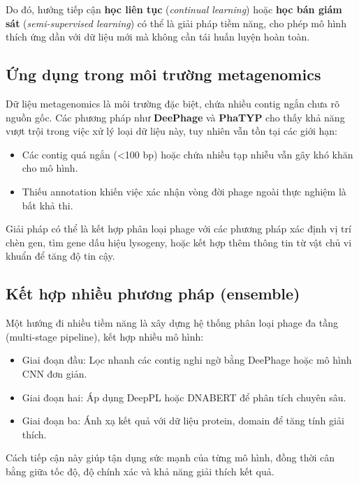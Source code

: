 Do đó, hướng tiếp cận \textbf{học liên tục} (\textit{continual learning}) hoặc \textbf{học bán giám sát} (\textit{semi-supervised learning}) có thể là giải pháp tiềm năng, cho phép mô hình thích ứng dần với dữ liệu mới mà không cần tái huấn luyện hoàn toàn.

\subsection{Ứng dụng trong môi trường metagenomics}

Dữ liệu metagenomics là môi trường đặc biệt, chứa nhiều contig ngắn chưa rõ nguồn gốc. Các phương pháp như \textbf{DeePhage} và \textbf{PhaTYP} cho thấy khả năng vượt trội trong việc xử lý loại dữ liệu này, tuy nhiên vẫn tồn tại các giới hạn:

\begin{itemize}
    \item Các contig quá ngắn (<100 bp) hoặc chứa nhiều tạp nhiễu vẫn gây khó khăn cho mô hình.
    \item Thiếu annotation khiến việc xác nhận vòng đời phage ngoài thực nghiệm là bất khả thi.
\end{itemize}

Giải pháp có thể là kết hợp phân loại phage với các phương pháp xác định vị trí chèn gen, tìm gene dấu hiệu lysogeny, hoặc kết hợp thêm thông tin từ vật chủ vi khuẩn để tăng độ tin cậy.

\subsection{Kết hợp nhiều phương pháp (ensemble)}

Một hướng đi nhiều tiềm năng là xây dựng hệ thống phân loại phage đa tầng (multi-stage pipeline), kết hợp nhiều mô hình:

\begin{itemize}
    \item Giai đoạn đầu: Lọc nhanh các contig nghi ngờ bằng DeePhage hoặc mô hình CNN đơn giản.
    \item Giai đoạn hai: Áp dụng DeepPL hoặc DNABERT để phân tích chuyên sâu.
    \item Giai đoạn ba: Ánh xạ kết quả với dữ liệu protein, domain để tăng tính giải thích.
\end{itemize}

Cách tiếp cận này giúp tận dụng sức mạnh của từng mô hình, đồng thời cân bằng giữa tốc độ, độ chính xác và khả năng giải thích kết quả.

